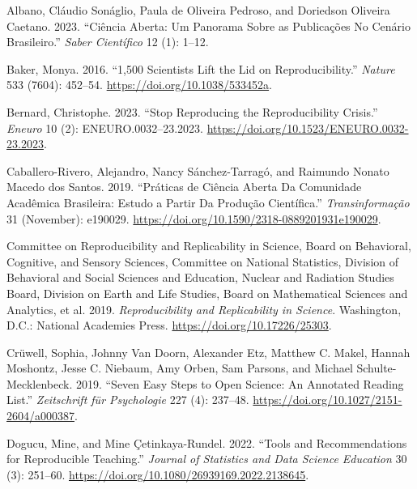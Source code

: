 \documentclass[
  a4paper,
]{article}
\newlength{\cslhangindent}
\newenvironment{CSLReferences}[2] %
 {\begin{list}{}{%
  \setlength{\itemindent}{0pt}
  \setlength{\leftmargin}{0pt}
  \setlength{\parsep}{0pt}
  \ifodd #1
   \setlength{\leftmargin}{\cslhangindent}
   \setlength{\itemindent}{-1\cslhangindent}
  \fi
  \setlength{\itemsep}{#2\baselineskip}}}
 {\end{list}}
\begin{document}
\label{refs}
\begin{CSLReferences}{1}{0}
Albano, Cláudio Sonáglio, Paula de Oliveira Pedroso, and Doriedson
Oliveira Caetano. 2023. {``Ci{ê}ncia {Aberta}: {Um Panorama Sobre} as
{Publica{ç}{õ}es No Cen{á}rio Brasileiro}.''} \emph{Saber Cient{í}fico}
12 (1): 1--12.

Baker, Monya. 2016. {``1,500 {Scientists Lift} the {Lid} on
{Reproducibility}.''} \emph{Nature} 533 (7604): 452--54.
\url{https://doi.org/10.1038/533452a}.

Bernard, Christophe. 2023. {``Stop {Reproducing} the {Reproducibility
Crisis}.''} \emph{Eneuro} 10 (2): ENEURO.0032--23.2023.
\url{https://doi.org/10.1523/ENEURO.0032-23.2023}.

Caballero-Rivero, Alejandro, Nancy Sánchez-Tarragó, and Raimundo Nonato
Macedo dos Santos. 2019. {``Pr{á}ticas de {Ci{ê}ncia Aberta} Da
Comunidade Acad{ê}mica Brasileira: Estudo a Partir Da Produ{ç}{ã}o
Cient{í}fica.''} \emph{Transinforma{ç}{ã}o} 31 (November): e190029.
\url{https://doi.org/10.1590/2318-0889201931e190029}.

Committee on Reproducibility and Replicability in Science, Board on
Behavioral, Cognitive, and Sensory Sciences, Committee on National
Statistics, Division of Behavioral and Social Sciences and Education,
Nuclear and Radiation Studies Board, Division on Earth and Life Studies,
Board on Mathematical Sciences and Analytics, et al. 2019.
\emph{Reproducibility and {Replicability} in {Science}}. Washington,
D.C.: National Academies Press. \url{https://doi.org/10.17226/25303}.

Crüwell, Sophia, Johnny Van Doorn, Alexander Etz, Matthew C. Makel,
Hannah Moshontz, Jesse C. Niebaum, Amy Orben, Sam Parsons, and Michael
Schulte-Mecklenbeck. 2019. {``Seven {Easy Steps} to {Open Science}: {An
Annotated Reading List}.''} \emph{Zeitschrift f{ü}r Psychologie} 227
(4): 237--48. \url{https://doi.org/10.1027/2151-2604/a000387}.

Dogucu, Mine, and Mine Çetinkaya-Rundel. 2022. {``Tools and
{Recommendations} for {Reproducible Teaching}.''} \emph{Journal of
Statistics and Data Science Education} 30 (3): 251--60.
\url{https://doi.org/10.1080/26939169.2022.2138645}.


\end{CSLReferences}
\end{document}
